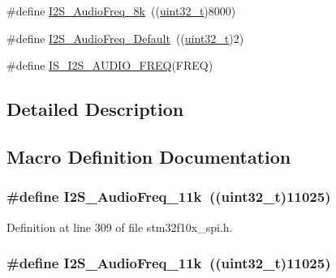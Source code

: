 \begin{DoxyCompactItemize}
\item 
\#define \hyperlink{group___i2_s___audio___frequency_ga7868ac234485a80d45586dd87cd00043}{I2\+S\+\_\+\+Audio\+Freq\+\_\+8k}~((\hyperlink{_p_e___types_8h_a33594304e786b158f3fb30289278f5af}{uint32\+\_\+t})8000)
\item 
\#define \hyperlink{group___i2_s___audio___frequency_ga30f78e8214e8a91cdb6d6360c1d3f18d}{I2\+S\+\_\+\+Audio\+Freq\+\_\+\+Default}~((\hyperlink{_p_e___types_8h_a33594304e786b158f3fb30289278f5af}{uint32\+\_\+t})2)
\item 
\#define \hyperlink{group___i2_s___audio___frequency_gaf39d917f4a38fd9916ec347fb055391c}{I\+S\+\_\+\+I2\+S\+\_\+\+A\+U\+D\+I\+O\+\_\+\+F\+R\+EQ}(F\+R\+EQ)
\end{DoxyCompactItemize}


\subsection{Detailed Description}


\subsection{Macro Definition Documentation}
\subsubsection[{\texorpdfstring{I2\+S\+\_\+\+Audio\+Freq\+\_\+11k}{I2S_AudioFreq_11k}}]{\setlength{\rightskip}{0pt plus 5cm}\#define I2\+S\+\_\+\+Audio\+Freq\+\_\+11k~(({\bf uint32\+\_\+t})11025)}\hypertarget{group___i2_s___audio___frequency_ga3adf95fadd1ad75670ed1babd5faca39}{}\label{group___i2_s___audio___frequency_ga3adf95fadd1ad75670ed1babd5faca39}


Definition at line 309 of file stm32f10x\+\_\+spi.\+h.

\subsubsection[{\texorpdfstring{I2\+S\+\_\+\+Audio\+Freq\+\_\+11k}{I2S_AudioFreq_11k}}]{\setlength{\rightskip}{0pt plus 5cm}\#define I2\+S\+\_\+\+Audio\+Freq\+\_\+11k~(({\bf uint32\+\_\+t})11025)}\hypertarget{group___i2_s___audio___frequency_ga3adf95fadd1ad75670ed1babd5faca39}{}\label{group___i2_s___audio___frequency_ga3adf95fadd1ad75670ed1babd5faca39}


